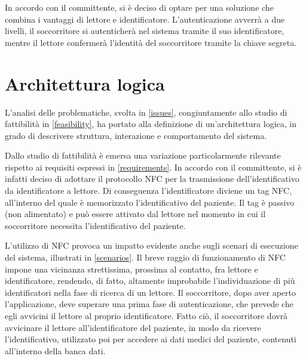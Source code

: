 \documentclass[a4paper,12pt]{report}
\begin{document}
In accordo con il committente, si è deciso di optare per una soluzione che combina i vantaggi di lettore e identificatore. L'autenticazione avverrà a due livelli, il soccorritore si autenticherà nel sistema tramite il suo identificatore, mentre il lettore confermerà l'identità del soccorritore tramite la chiave segreta.  

\section{Architettura logica}
L'analisi delle problematiche, svolta in \autoref{issues}, congiuntamente allo studio di fattibilità in \autoref{feasibility}, ha portato alla definizione di un'architettura logica, in grado di descrivere struttura, interazione e comportamento del sistema.

Dallo studio di fattibilità è emersa una variazione particolarmente rilevante rispetto ai requisiti espressi in \autoref{requirements}. In accordo con il committente, si è infatti deciso di adottare il protocollo NFC per la trasmissione dell'identificativo da identificatore a lettore. Di conseguenza l'identificatore diviene un tag NFC, all'interno del quale è memorizzato l'identificativo del paziente. Il tag è passivo (non alimentato) e può essere attivato dal lettore nel momento in cui il soccorritore necessita l'identificativo del paziente.

L'utilizzo di NFC provoca un impatto evidente anche sugli scenari di esecuzione del sistema, illustrati in \autoref{scenarios}. Il breve raggio di funzionamento di NFC impone una vicinanza strettissima, prossima al contatto, fra lettore e identificatore, rendendo, di fatto, altamente improbabile l'individuazione di più identificatori nella fase di ricerca di un lettore. Il soccorritore, dopo aver aperto l'applicazione, deve superare una prima fase di autenticazione, che prevede che egli avvicini il lettore al proprio identificatore. Fatto ciò, il soccorritore dovrà avvicinare il lettore all'identificatore del paziente, in modo da ricevere l'identificativo, utilizzato poi per accedere ai dati medici del paziente, contenuti all'interno della banca dati. 
\end{document}
